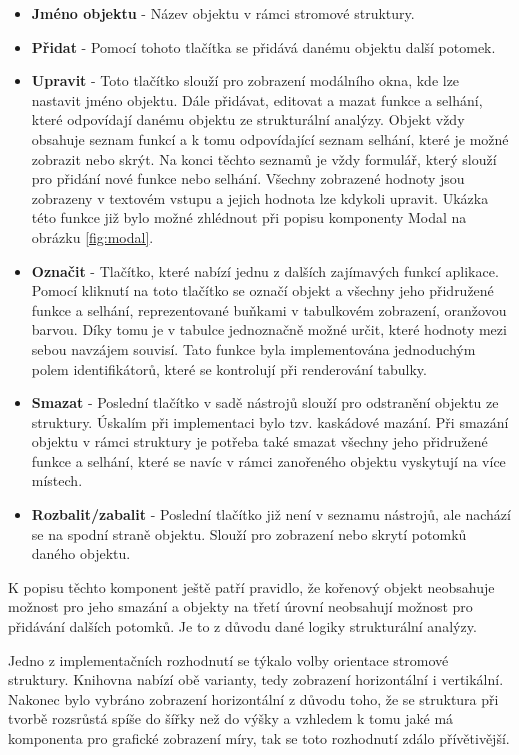 \begin{itemize}
    \item \textbf{Jméno objektu} - Název objektu v rámci stromové struktury. 
    \item \textbf{Přidat} - Pomocí tohoto tlačítka se přidává danému objektu další potomek. 
    \item \textbf{Upravit} - Toto tlačítko slouží pro zobrazení modálního okna, kde lze nastavit jméno objektu. Dále přidávat, editovat a mazat funkce a selhání, které odpovídají danému objektu ze strukturální analýzy. Objekt vždy obsahuje seznam funkcí a k tomu odpovídající seznam selhání, které je možné zobrazit nebo skrýt. Na konci těchto seznamů je vždy formulář, který slouží pro přidání nové funkce nebo selhání. Všechny zobrazené hodnoty jsou zobrazeny v textovém vstupu a jejich hodnota lze kdykoli upravit. Ukázka této funkce již bylo možné zhlédnout při popisu komponenty Modal na obrázku \ref{fig:modal}.
    \item \textbf{Označit} - Tlačítko, které nabízí jednu z dalších zajímavých funkcí aplikace. Pomocí kliknutí na toto tlačítko se označí objekt a všechny jeho přidružené funkce a selhání, reprezentované buňkami v tabulkovém zobrazení, oranžovou barvou. Díky tomu je v tabulce jednoznačně možné určit, které hodnoty mezi sebou navzájem souvisí. Tato funkce byla implementována jednoduchým polem identifikátorů, které se kontrolují při renderování tabulky. 
    \item \textbf{Smazat} - Poslední tlačítko v sadě nástrojů slouží pro odstranění objektu ze struktury. Úskalím při implementaci bylo tzv. kaskádové mazání. Při smazání objektu v rámci struktury je potřeba také smazat všechny jeho přidružené funkce a selhání, které se navíc v rámci zanořeného objektu vyskytují na více místech. 
    \item \textbf{Rozbalit/zabalit} - Poslední tlačítko již není v seznamu nástrojů, ale nachází se na spodní straně objektu. Slouží pro zobrazení nebo skrytí potomků daného objektu. 
\end{itemize}

K popisu těchto komponent ještě patří pravidlo, že kořenový objekt neobsahuje možnost pro jeho smazání a objekty na třetí úrovní neobsahují možnost pro přidávání dalších potomků. Je to z důvodu dané logiky strukturální analýzy. 

Jedno z implementačních rozhodnutí se týkalo volby orientace stromové struktury. Knihovna nabízí obě varianty, tedy zobrazení horizontální i vertikální. Nakonec bylo vybráno zobrazení horizontální z důvodu toho, že se struktura při tvorbě rozsrůstá spíše do šířky než do výšky a vzhledem k tomu jaké má komponenta pro grafické zobrazení míry, tak se toto rozhodnutí zdálo přívětivější. 


